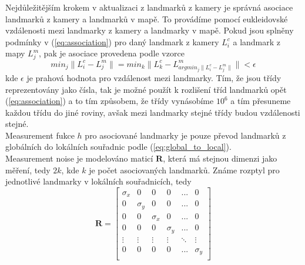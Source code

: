 \documentclass[a4paper,12pt]{article}
\begin{document}
Nejdůležitějším krokem v aktualizaci z landmarků z kamery je správná asociace landmarků z kamery a landmarků v mapě. 
To provádíme pomocí eukleidovské vzdálenosti mezi landmarky z kamery a landmarky v mapě.
Pokud jsou splněny podmínky v (\ref{eq:association}) pro daný landmark z kamery $L^c_i$ a landmark z mapy $L^m_j$, pak je asociace provedena podle vzorce
\begin{equation}
    min_{j} \|L^c_{i} - L^m_{j} \| = min_{k} \|L^c_{k} - L^m_{argmin_{j} \|L^c_{i} - L^m_{j} \|}\| < \epsilon
    \label{eq:association} 
\end{equation}
kde $\epsilon$ je prahová hodnota pro vzdálenost mezi landmarky. 
Tím, že jsou třídy reprezentovány jako čísla, tak je možné použít k rozlišení tříd landmarků opět (\ref{eq:association}) a to tím způsobem, 
že třídy vynásobíme $10^6$ a tím přesuneme každou třídu do jiné roviny, avšak mezi landmarky stejné třídy budou vzdálenosti stejné.\\
Measurement fukce $h$ pro asociované landmarky je pouze převod landmarků z globálních do lokálních souřadnic podle (\ref{eq:global_to_local}).
\\
Measurement noise je modelováno maticí $\mathbf R$, která má stejnou dimenzi jako měření, tedy $2k$, kde $k$ je počet asociovaných landmarků.
Známe rozptyl pro jednotlivé landmarky v lokálních souřadnicích, tedy
\begin{equation}
    \mathbf R = \begin{bmatrix}
        \sigma_{x} & 0 & 0 & 0 & ... & 0\\
        0 & \sigma_{y} & 0 & 0 & ... & 0 \\
        0 & 0 & \sigma_{x} & 0 & ... & 0\\
        0 & 0 & 0 & \sigma_{y} & ... & 0\\
        \vdots & \vdots & \vdots & \vdots & \ddots & \vdots \\
        0 & 0 & 0 & 0 & ... & \sigma_{y}\\
    \end{bmatrix}
\end{equation}
\end{document}
